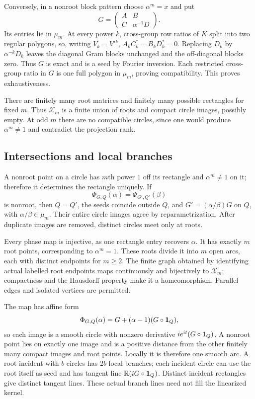 Conversely, in a nonroot block pattern choose $\alpha^m=x$ and put
\[
 G=\begin{pmatrix}A&B\\C&\alpha^{-1}D\end{pmatrix}.
\]
Its entries lie in $\mu_m$. At every power $k$, cross-group row ratios of $K$ split into two regular polygons, so, writing $V_k=V^{\circ k}$, $A_kC_k^*=B_kD_k^*=0$. Replacing $D_k$ by $\alpha^{-k}D_k$ leaves the diagonal Gram blocks unchanged and the off-diagonal blocks zero. Thus $G$ is exact and is a seed by Fourier inversion. Each restricted cross-group ratio in $G$ is one full polygon in $\mu_m$, proving compatibility. This proves exhaustiveness.

There are finitely many root matrices and finitely many possible rectangles for fixed $m$. Thus $\mathcal X_m$ is a finite union of roots and compact circle images, possibly empty. At odd $m$ there are no compatible circles, since one would produce $\alpha^m\ne1$ and contradict the projection rank.

\subsection{Intersections and local branches}
A nonroot point on a circle has $m$th power $1$ off its rectangle and $\alpha^m\ne1$ on it; therefore it determines the rectangle uniquely. If
\[
 \Phi_{G,Q}(\alpha)=\Phi_{G',Q'}(\beta)
\]
is nonroot, then $Q=Q'$, the seeds coincide outside $Q$, and $G'=(\alpha/\beta)G$ on $Q$, with $\alpha/\beta\in\mu_m$. Their entire circle images agree by reparametrization. After duplicate images are removed, distinct circles meet only at roots.

Every phase map is injective, as one rectangle entry recovers $\alpha$. It has exactly $m$ root points, corresponding to $\alpha^m=1$. These roots divide it into $m$ open arcs, each with distinct endpoints for $m\ge2$. The finite graph obtained by identifying actual labelled root endpoints maps continuously and bijectively to $\mathcal X_m$; compactness and the Hausdorff property make it a homeomorphism. Parallel edges and isolated vertices are permitted.

The map has affine form
\[
 \Phi_{G,Q}(\alpha)=G+(\alpha-1)(G\circ\mathbf1_Q),
\]
so each image is a smooth circle with nonzero derivative $ie^{it}(G\circ\mathbf1_Q)$. A nonroot point lies on exactly one image and is a positive distance from the other finitely many compact images and root points. Locally it is therefore one smooth arc. A root incident with $b$ circles has $2b$ local branches; each incident circle can use the root itself as seed and has tangent line $\mathbb R(iG\circ\mathbf1_Q)$. Distinct incident rectangles give distinct tangent lines. These actual branch lines need not fill the linearized kernel.

